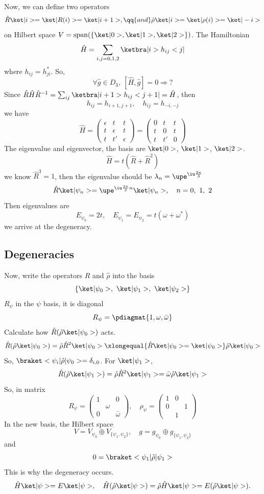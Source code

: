 Now, we can define two operators
\[
  \hat R\ket|i> = \ket|R(i)> = \ket|i + 1>, \qq{and}
  \hat\rho\ket|i> = \ket|\rho(i)> = \ket|-i>
\]
on Hilbert space $V = \operatorname{span}(\{\ket|0>, \ket|1>, \ket|2>\})$.
The Hamiltonian
\[
  \hat H = \sum_{i,j = 0,1,2} \ketbra|i> h_{ij} <j|
\]
where $h_{ij} = h_{ji}^*$. So,
\[
  \forall \hat g \in D_3,\ [\hat H, \hat g] = 0 \Rightarrow ?
\]
Since $\hat R\hat H\hat R^{-1} = \sum_{ij} \ketbra|i+1>h_{ij}<j+1| = \hat H$, then
\[
  h_{ij} = h_{i+1,j+1}, \quad
  h_{ij} = h_{-i, -j}
\]
we have
\[
  \hat H = \begin{pmatrix}
    \epsilon & t & t\\ t& \epsilon & t\\t & t' & \epsilon
  \end{pmatrix} =
  \begin{pmatrix}
    0 & t  & t\\
    t & 0  & t\\
    t & t' & 0
  \end{pmatrix}
\]
The eigenvalue and eigenvector, the basis are $\ket|0>$, $\ket|1>$, $\ket|2>$.
\[
  \hat H = t(\hat R + \hat R^2)
\]
we know $\hat R^3 = 1$, then the eigenvalue should be
$\lambda_n = \upe^{\iu\frac{2\pi}3}$
\[
  \hat R\ket|\psi_n> = \upe^{\iu\frac{2\pi}{3}n} \ket|\psi_n>, \quad
  n = 0,\ 1,\ 2
\]
Then eigenvalues are
\[
  E_{\psi_0} = 2t, \quad E_{\psi_1} = E_{\psi_2} = t(\omega + \omega^*)
\]
we arrive at the degeneracy.

\subsection{Degeneracies}

Now, write the operators $\hat R$ and $\hat \rho$ into the basis
\[
  \{\ket|\psi_0>,\ \ket|\psi_1>,\ \ket|\psi_2>\}
\]
$R_\psi$ in the $\psi$ basis, it is diagonal
\[
  R_\psi = \pdiagmat{1, \omega, \bar\omega}
\]
Calculate how $\hat R(\hat\rho\ket|\psi_0>)$ acts.
\[
  \hat R(\hat\rho\ket|\psi_0>) = \hat\rho \hat R^2 \ket|\psi_0>
\xlongequal{\hat R\ket|\psi_0> = \ket|\psi_0>} \hat\rho\ket|\psi_0>
\]
So, $\braket<\psi_i|\hat\rho|\psi_0> = \delta_{i,0}$.
For $\ket|\psi_1>$,
\[
  \hat R(\hat\rho\ket|\psi_1>) = \hat\rho \hat R^2 \ket|\psi_1>
= \bar\omega \hat\rho \ket|\psi_1>
\]
So, in matrix
\[
  R_\psi = \begin{pmatrix}
    1 & & 0\\
    & \omega\\
    0 & & \bar\omega
  \end{pmatrix}, \quad
  \rho_\psi = \begin{pmatrix}
    1 & 0\\
    0 & & 1\\
    & 1
  \end{pmatrix}
\]
In the new basis, the Hilbert space
\[
  V = V_{\psi_0} \oplus V_{\{\psi_1, \psi_2\}}, \quad
  g = g_{\psi_0} \oplus g_{\{\psi_1,\psi_2\}}
\]
and
\[
  0 = \braket<\psi_1|\hat\rho|\psi_1>
\]
This is why the degeneracy occurs.
\[
  \hat H\ket|\psi> = E\ket|\psi>, \quad
  \hat H(\hat\rho\ket|\psi>) = \hat\rho \hat H\ket|\psi>
= E(\hat\rho\ket|\psi>).
\]

